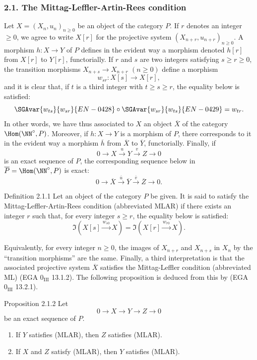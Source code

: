 \subsubsection*{2.1. The Mittag-Leffler-Artin-Rees condition}
Let $X=(X_n,u_n)_{n\ge0}$ be an object of the category $P$. If $r$ denotes an integer $\ge0$, we agree to write $X[r]$ for the projective system $(X_{n+r},u_{n+r})_{n\ge0}$. A morphism $h:X\to Y$ of $P$ defines in the evident way a morphism denoted $h[r]$ from $X[r]$ to $Y[r]$, functorially. If $r$ and $s$ are two integers satisfying $s\ge r\ge0$, the transition morphisms $X_{n+s}\to X_{n+r}$ $(n\ge0)$ define a morphism
\[
w_{sr}:X[s]\longrightarrow X[r],
\]
and it is clear that, if $t$ is a third integer with $t\ge s\ge r$, the equality below is satisfied:
\[
\SGAvar{w_{ts}}{w_{sr}}{EN-0428}\circ \SGAvar{w_{sr}}{w_{ts}}{EN-0429}=w_{tr}.
\]
In other words, we have thus associated to $X$ an object $\overline X$ of the category $\Hom(\NN^\circ,P)$. Moreover, if $h:X\to Y$ is a morphism of $P$, there corresponds to it in the evident way a morphism $\overline h$ from $\overline X$ to $\overline Y$, functorially. Finally, if
\[
0\longrightarrow X\stackrel{u}{\longrightarrow}Y\stackrel{v}{\longrightarrow}Z\longrightarrow0
\]
is an exact sequence of $P$, the corresponding sequence below in $\overline P=\Hom(\NN^\circ,P)$ is exact:
\[
0\longrightarrow\overline X\stackrel{\overline u}{\longrightarrow}\overline Y\stackrel{\overline v}{\longrightarrow}\overline Z\longrightarrow0.
\]

\begin{statement}{Definition 2.1.1}
Let an object of the category $P$ be given. It is said to satisfy the Mittag-Leffler-Artin-Rees condition (abbreviated MLAR) if there exists an integer $r$ such that, for every integer $s\ge r$, the equality below is satisfied:
\[
\Im(X[s]\xrightarrow{w_{s0}}X)=\Im(X[r]\xrightarrow{w_{r0}}X).
\]
\end{statement}
Equivalently, for every integer $n\ge0$, the images of $X_{n+r}$ and $X_{n+s}$ in $X_n$ by the ``transition morphisms'' are the same. Finally, a third interpretation is that the associated projective system $\overline X$ satisfies the Mittag-Leffler condition (abbreviated ML) (EGA $0_{\mathrm{III}}$ 13.1.2). The following proposition is deduced from this by (EGA $0_{\mathrm{III}}$ 13.2.1).

\begin{statement}{Proposition 2.1.2}
Let
\[
0\longrightarrow X\longrightarrow Y\longrightarrow Z\longrightarrow0
\]
be an exact sequence of $P$.
\begin{enumerate}[label=(\roman*)]
\item If $Y$ satisfies (MLAR), then $Z$ satisfies (MLAR).
\item If $X$ and $Z$ satisfy (MLAR), then $Y$ satisfies (MLAR).
\end{enumerate}
\end{statement}

